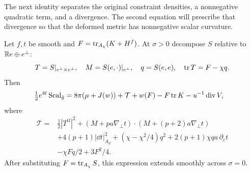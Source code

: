 The next identity separates the original constraint densities, a
nonnegative quadratic term, and a divergence.  The second equation will
prescribe that divergence so that the deformed metric has nonnegative
scalar curvature.

\begin{proposition}\label{n3:deformation:identity}
Let $f,t$ be smooth and $F=\operatorname{tr}_{A_\chi}(K+H^f)$. At $\sigma>0$ decompose
$S$ relative to $\mathbb R e\oplus e^\perp$:
\[
 T=S|_{e^\perp\times e^\perp},\quad
 M=S(e,\cdot)|_{e^\perp},\quad q=S(e,e),\quad \operatorname{tr} T=F-\chi q.
\]
Then
\begin{equation}\label{n3:deformation:scalar-identity}
 \begin{split}
 \tfrac12e^{4t}\operatorname{Scal}_{\hat g}
 ={}&8\pi(\mu+J(w))+\mathcal T
       +w(F)-F\operatorname{tr} K-u^{-1}\operatorname{div} V,
 \end{split}
\end{equation}
where
\begin{equation}\label{n3:deformation:quadratic-term}
 \begin{split}
 \mathcal T={}&\tfrac12|T^{\operatorname{tf}}|^2
 +(M+pa\nabla_\perp t)\cdot(M+(p+2)a\nabla_\perp t)\\
 &+4(p+1)|\dd t|_{A_d}^2
   +(\chi-\chi^2/4)q^2+2(p+1)\chi qa\,\partial_e t\\
 &-\chi Fq/2+3F^2/4.
 \end{split}
\end{equation}
After substituting $F=\operatorname{tr}_{A_\chi}S$, this expression extends smoothly
across $\sigma=0$.
\end{proposition}

